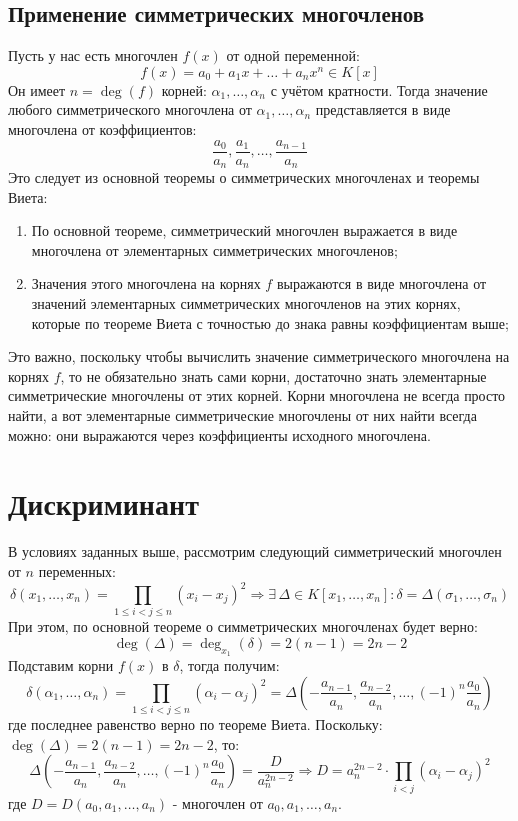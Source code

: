 \documentclass[12pt]{article}
\theoremstyle{definition}
\begin{document}
\subsection*{Применение симметрических многочленов}
Пусть у нас есть многочлен $f(x)$ от одной переменной: 
$$
	f(x) = a_0 + a_1x + \dotsc + a_nx^n \in K[x]
$$ 
Он имеет $n = \deg(f)$ корней: $\alpha_1,\dotsc,\alpha_n$ с учётом кратности. Тогда значение любого симметрического многочлена от $\alpha_1,\dotsc,\alpha_n$ представляется в виде многочлена от коэффициентов:
$$
	\dfrac{a_0}{a_n}, \dfrac{a_1}{a_n},\dotsc, \dfrac{a_{n-1}}{a_n}
$$
Это следует из основной теоремы о симметрических многочленах и теоремы Виета: 
\begin{enumerate}[label=\arabic*)]
	\item По основной теореме, симметрический многочлен выражается в виде многочлена от элементарных симметрических многочленов;
	\item Значения этого многочлена на корнях $f$ выражаются в виде многочлена от значений элементарных симметрических многочленов на этих корнях, которые по теореме Виета с точностью до знака равны коэффициентам выше;
\end{enumerate}
Это важно, поскольку чтобы вычислить значение симметрического многочлена на корнях $f$, то не обязательно знать сами корни, достаточно знать элементарные симметрические многочлены от этих корней. Корни многочлена не всегда просто найти, а вот элементарные симметрические многочлены от них найти всегда можно: они выражаются через коэффициенты исходного многочлена.

\section*{Дискриминант}
В условиях заданных выше, рассмотрим следующий симметрический многочлен от $n$ переменных:
$$
	\delta(x_1,\dotsc,x_n) = \prod\limits_{1 \leq i< j \leq n}(x_i - x_j)^2 \Rightarrow \exists \, \Delta \in K[x_1,\dotsc, x_n] \colon \delta = \Delta(\sigma_1,\dotsc, \sigma_n)
$$
При этом, по основной теореме о симметрических многочленах будет верно:
$$
	\deg(\Delta) = \deg_{x_1}(\delta) = 2(n-1) = 2n - 2
$$ 
Подставим корни $f(x)$ в $\delta$, тогда получим:
$$
	\delta(\alpha_1,\dotsc,\alpha_n) = \prod\limits_{1 \leq i< j \leq n}(\alpha_i - \alpha_j)^2 = \Delta\left(-\dfrac{a_{n-1}}{a_n}, \dfrac{a_{n-2}}{a_n}, \dotsc, (-1)^n\dfrac{a_0}{a_n}\right)
$$
где последнее равенство верно по теореме Виета. Поскольку: $\deg(\Delta) = 2(n-1) = 2n - 2$, то:
$$
	\Delta\left(-\dfrac{a_{n-1}}{a_n}, \dfrac{a_{n-2}}{a_n}, \dotsc, (-1)^n\dfrac{a_0}{a_n}\right) = \dfrac{D}{a_n^{2n-2}} \Rightarrow D = a_n^{2n-2}{\cdot}\prod\limits_{i< j}(\alpha_i - \alpha_j)^2
$$
где $D = D(a_0,a_1,\dotsc, a_n)$ - многочлен от $a_0,a_1,\dotsc,a_n$.
\end{document}
